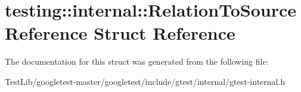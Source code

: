 \hypertarget{structtesting_1_1internal_1_1RelationToSourceReference}{}\section{testing\+:\+:internal\+:\+:Relation\+To\+Source\+Reference Struct Reference}
\label{structtesting_1_1internal_1_1RelationToSourceReference}


The documentation for this struct was generated from the following file\+:\begin{DoxyCompactItemize}
\item 
Test\+Lib/googletest-\/master/googletest/include/gtest/internal/gtest-\/internal.\+h\end{DoxyCompactItemize}
